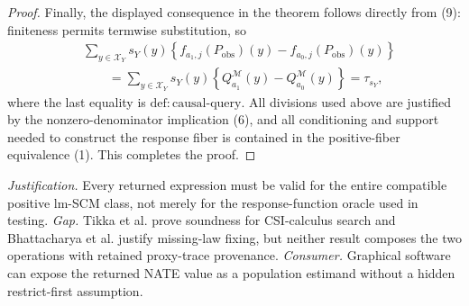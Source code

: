 \documentclass{article}
\begin{document}
\begin{proof}
Finally, the displayed consequence in the theorem follows directly from (9): finiteness permits termwise substitution, so
\[
\begin{aligned}
&\sum_{y\in\mathcal X_Y}s_Y(y)
\left\{f_{a_1,j}(P_{\mathrm{obs}})(y)-f_{a_0,j}(P_{\mathrm{obs}})(y)\right\}\\
&\qquad=
\sum_{y\in\mathcal X_Y}s_Y(y)
\left\{Q_{a_1}^{\mathcal M}(y)-Q_{a_0}^{\mathcal M}(y)\right\}
=\tau_{s_Y},
\end{aligned}
\tag{14}
\]
where the last equality is \(\mathrm{def{:}causal\text{-}query}\).  All divisions used above are justified by the nonzero-denominator implication (6), and all conditioning and support needed to construct the response fiber is contained in the positive-fiber equivalence (1).  This completes the proof.
\end{proof}
\par\smallskip\noindent \textit{Justification.} Every returned expression must be valid for the entire compatible positive lm-SCM class, not merely for the response-function oracle used in testing. \textit{Gap.} Tikka et al. prove soundness for CSI-calculus search and Bhattacharya et al. justify missing-law fixing, but neither result composes the two operations with retained proxy-trace provenance. \textit{Consumer.} Graphical software can expose the returned NATE value as a population estimand without a hidden restrict-first assumption.
\end{document}
